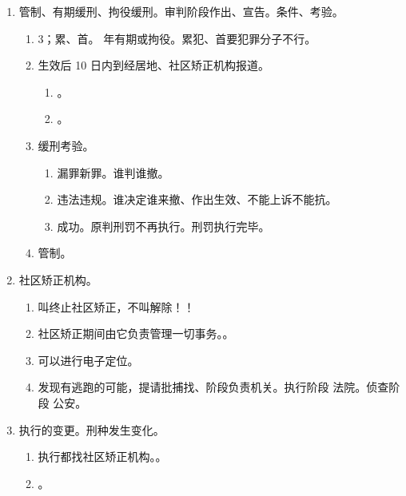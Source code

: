 \begin{enumerate}
\begin{enumerate}
          \item 执行担保。可以先行查扣冻 \hz 要求提供担保。
        \end{enumerate}
  \item 管制、有期缓刑、拘役缓刑。审判阶段作出、宣告。条件、考验。
        \begin{enumerate}
          \item 3；累、首。 年有期或拘役。累犯、首要犯罪分子不行。
          \item 生效后 10 日内到经居地、社区矫正机构报道。
                \begin{enumerate}
                  \item {}。
                  \item {}。
                \end{enumerate}
          \item 缓刑考验。
                \begin{enumerate}
                  \item 漏罪新罪。谁判谁撤。
                  \item 违法违规。谁决定谁来撤、作出生效、不能上诉不能抗。
                  \item 成功。原判刑罚不再执行。\bdy 刑罚执行完毕。
                \end{enumerate}
          \item 管制。
        \end{enumerate}
  \item 社区矫正机构。
        \begin{enumerate}
          \item 叫终止社区矫正，不叫解除！！
          \item 社区矫正期间由它负责管理一切事务。。
          \item 可以进行电子定位。
          \item 发现有逃跑的可能，提请批捕找、阶段负责机关。执行阶段 \yjt 法院。侦查阶段 \yjt 公安。
        \end{enumerate}
  \item 执行的变更。刑种发生变化。
        \begin{enumerate}
          \item 执行都找社区矫正机构。。
          \item {}。
                \begin{enumerate}

\end{enumerate}
\end{enumerate}
\end{enumerate}
